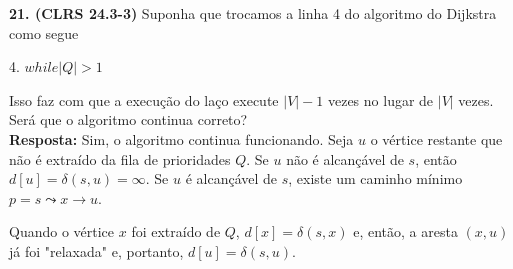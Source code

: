 
\noindent\textbf{21. (CLRS 24.3-3)} Suponha que trocamos a linha 4 do algoritmo do Dijkstra como segue
\begin{center}
4. $while|Q| > 1$
\end{center}
Isso faz com que a execução do laço execute $|V| - 1$ vezes no lugar de $|V|$ vezes. Será que o algoritmo continua correto?\\[6pt]
\textbf{Resposta:} Sim, o algoritmo continua funcionando. Seja $u$ o vértice restante que não é extraído da fila de prioridades $Q$. Se $u$ não é alcançável de $s$, então $d[u] = \delta(s, u) = \infty$. Se $u$ é alcançável de $s$, existe um caminho mínimo $p = s \leadsto x \rightarrow u$.

Quando o vértice $x$ foi extraído de $Q$, $d[x] = \delta(s, x)$ e, então, a aresta $(x, u)$ já foi "relaxada" e, portanto, $d[u] = \delta(s, u)$.\\[12pt]